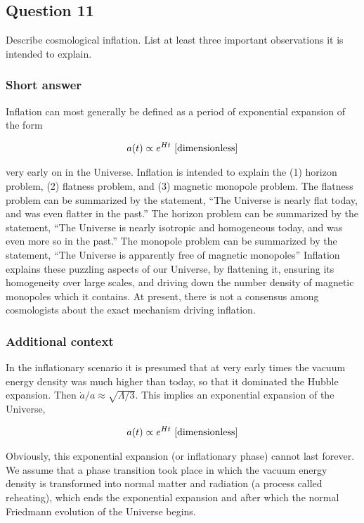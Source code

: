 \documentclass[a4paper,11pt]{article}
\begin{document}
\newpage
\subsection{Question 11}

Describe cosmological inflation. List at least three important observations it is intended to explain.

\subsubsection{Short answer}

Inflation can most generally be defined as a period of exponential expansion of the form

\begin{align*}
    a(t) \propto e^{Ht} ~ [{\rm dimensionless}]
\end{align*}

{\noindent}very early on in the Universe. Inflation is intended to explain the (1) horizon problem, (2) flatness problem, and (3) magnetic monopole problem. The flatness problem can be summarized by the statement, ``The Universe is nearly flat today, and was even flatter in the past.'' The horizon problem can be summarized by the statement, ``The Universe is nearly isotropic and homogeneous today, and was even more so in the past.'' The monopole problem can be summarized by the statement, ``The Universe is apparently free of magnetic monopoles'' Inflation explains these puzzling aspects of our Universe, by flattening it, ensuring its homogeneity over large scales, and driving down the number density of magnetic monopoles which it contains. At present, there is not a consensus among cosmologists about the exact mechanism driving inflation.

\subsubsection{Additional context}

In the inflationary scenario it is presumed that at very
early times the vacuum energy density was much higher
than today, so that it dominated the Hubble expansion. Then $\dot{a}/a\approx\sqrt{\Lambda/3}$. This implies an exponential expansion of the Universe,

\begin{align*}
    a(t) \propto e^{Ht} ~ [{\rm dimensionless}]
\end{align*}

{\noindent}Obviously, this exponential expansion (or inflationary phase) cannot last forever. We assume that a phase transition took place in which the vacuum energy density is transformed into normal matter and radiation (a process called reheating), which ends the exponential expansion and after which the normal Friedmann evolution of the Universe begins.
\end{document}
